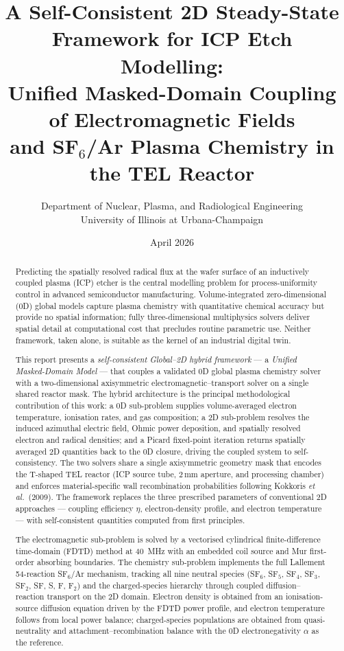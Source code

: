 \documentclass[11pt,a4paper]{report}
\title{A Self-Consistent 2D Steady-State Framework for ICP Etch Modelling:\\[6pt]
\large Unified Masked-Domain Coupling of Electromagnetic Fields\\
and SF$_6$/Ar Plasma Chemistry in the TEL Reactor}
\author{Department of Nuclear, Plasma, and Radiological Engineering\\
University of Illinois at Urbana-Champaign}
\date{April 2026}
\begin{document}
\maketitle

\begin{abstract}
Predicting the spatially resolved radical flux at the wafer surface of an inductively coupled plasma (ICP) etcher is the central modelling problem for process-uniformity control in advanced semiconductor manufacturing. Volume-integrated zero-dimensional (0D) global models capture plasma chemistry with quantitative chemical accuracy but provide no spatial information; fully three-dimensional multiphysics solvers deliver spatial detail at computational cost that precludes routine parametric use. Neither framework, taken alone, is suitable as the kernel of an industrial digital twin.

This report presents a \emph{self-consistent Global--2D hybrid framework} --- a \emph{Unified Masked-Domain Model} --- that couples a validated 0D global plasma chemistry solver with a two-dimensional axisymmetric electromagnetic--transport solver on a single shared reactor mask. The hybrid architecture is the principal methodological contribution of this work: a 0D sub-problem supplies volume-averaged electron temperature, ionisation rates, and gas composition; a 2D sub-problem resolves the induced azimuthal electric field, Ohmic power deposition, and spatially resolved electron and radical densities; and a Picard fixed-point iteration returns spatially averaged 2D quantities back to the 0D closure, driving the coupled system to self-consistency. The two solvers share a single axisymmetric geometry mask that encodes the T-shaped TEL reactor (ICP source tube, 2\,mm aperture, and processing chamber) and enforces material-specific wall recombination probabilities following Kokkoris \textit{et al.}\ (2009). The framework replaces the three prescribed parameters of conventional 2D approaches --- coupling efficiency $\eta$, electron-density profile, and electron temperature --- with self-consistent quantities computed from first principles.

The electromagnetic sub-problem is solved by a vectorised cylindrical finite-difference time-domain (FDTD) method at \SI{40}{\mega\hertz} with an embedded coil source and Mur first-order absorbing boundaries. The chemistry sub-problem implements the full Lallement 54-reaction SF$_6$/Ar mechanism, tracking all nine neutral species (SF$_6$, SF$_5$, SF$_4$, SF$_3$, SF$_2$, SF, S, F, F$_2$) and the charged-species hierarchy through coupled diffusion--reaction transport on the 2D domain. Electron density is obtained from an ionisation-source diffusion equation driven by the FDTD power profile, and electron temperature follows from local power balance; charged-species populations are obtained from quasi-neutrality and attachment--recombination balance with the 0D electronegativity $\alpha$ as the reference.


\end{abstract}
\end{document}

